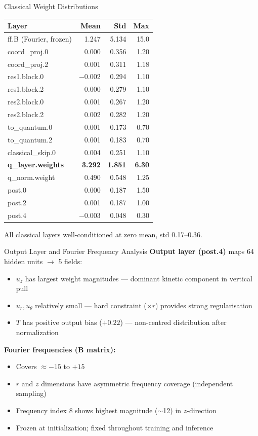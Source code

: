 \documentclass[aspectratio=169]{beamer}
\begin{document}
\begin{frame}{Classical Weight Distributions}
\begin{table}
\centering
\scriptsize
\begin{tabular}{lrrr}
\toprule
Layer & Mean & Std & Max \\
\midrule
ff.B (Fourier, frozen) & 1.247 & 5.134 & 15.0 \\
coord\_proj.0 & 0.000 & 0.356 & 1.20 \\
coord\_proj.2 & 0.001 & 0.311 & 1.18 \\
res1.block.0 & $-0.002$ & 0.294 & 1.10 \\
res1.block.2 & 0.000 & 0.279 & 1.10 \\
res2.block.0 & 0.001 & 0.267 & 1.20 \\
res2.block.2 & 0.002 & 0.282 & 1.20 \\
to\_quantum.0 & 0.001 & 0.173 & 0.70 \\
to\_quantum.2 & 0.001 & 0.183 & 0.70 \\
classical\_skip.0 & 0.004 & 0.251 & 1.10 \\
\textbf{q\_layer.weights} & \textbf{3.292} & \textbf{1.851} & \textbf{6.30} \\
q\_norm.weight & 0.490 & 0.548 & 1.25 \\
post.0 & 0.000 & 0.187 & 1.50 \\
post.2 & 0.001 & 0.187 & 1.00 \\
post.4 & $-0.003$ & 0.048 & 0.30 \\
\bottomrule
\end{tabular}
\end{table}
All classical layers well-conditioned at zero mean, std 0.17--0.36.
\end{frame}

\begin{frame}{Output Layer and Fourier Frequency Analysis}
\textbf{Output layer (post.4)} maps 64 hidden units $\to$ 5 fields:
\begin{itemize}
  \item $u_z$ has largest weight magnitudes --- dominant kinetic component in vertical pull
  \item $u_r, u_\theta$ relatively small --- hard constraint ($\times r$) provides strong regularisation
  \item $T$ has positive output bias ($+0.22$) --- non-centred distribution after normalization
\end{itemize}

\vspace{0.4cm}
\textbf{Fourier frequencies (B matrix):}
\begin{itemize}
  \item Covers $\approx -15$ to $+15$
  \item $r$ and $z$ dimensions have asymmetric frequency coverage (independent sampling)
  \item Frequency index 8 shows highest magnitude ($\sim$12) in $z$-direction
  \item Frozen at initialization; fixed throughout training and inference
\end{itemize}
\end{frame}
\end{document}
